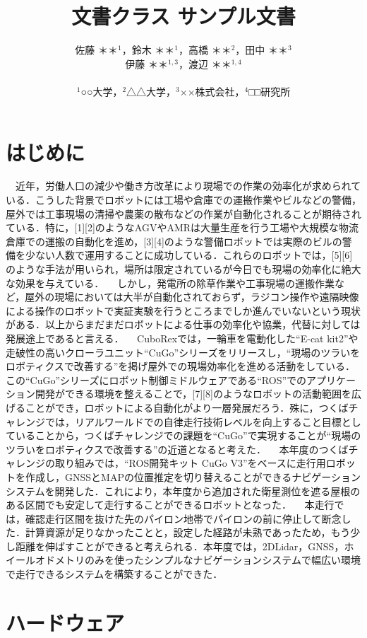 \documentclass[platex,dvipdfmx]{rbproceedings}
\title{\pkg{RBProceedings}文書クラス サンプル文書}
\author{%
佐藤 ＊＊${}^{1}$，鈴木 ＊＊${}^{1}$，高橋 ＊＊${}^{2}$，田中 ＊＊${}^{3}$\\
伊藤 ＊＊${}^{1,3}$，渡辺 ＊＊${}^{1,4}$\\ \\
${}^{1}$○○大学，${}^{2}$△△大学，${}^{3}$××株式会社，${}^{4}$□□研究所
}
\begin{document}
\maketitle


\section{はじめに}
　近年，労働人口の減少や働き方改革により現場での作業の効率化が求められている．こうした背景でロボットには工場や倉庫での運搬作業やビルなどの警備，屋外では工事現場の清掃や農薬の散布などの作業が自動化されることが期待されている．特に，[1][2]のようなAGVやAMRは大量生産を行う工場や大規模な物流倉庫での運搬の自動化を進め，[3][4]のような警備ロボットでは実際のビルの警備を少ない人数で運用することに成功している．これらのロボットでは，[5][6]のような手法が用いられ，場所は限定されているが今日でも現場の効率化に絶大な効果を与えている．
　しかし，発電所の除草作業や工事現場の運搬作業など，屋外の現場においては大半が自動化されておらず，ラジコン操作や遠隔映像による操作のロボットで実証実験を行うところまでしか進んでいないという現状がある．以上からまだまだロボットによる仕事の効率化や協業，代替に対しては発展途上であると言える．
　CuboRexでは，一輪車を電動化した“E-cat kit2”や走破性の高いクローラユニット“CuGo”シリーズをリリースし，“現場のツラいをロボティクスで改善する”を掲げ屋外での現場効率化を進める活動をしている．この“CuGo”シリーズにロボット制御ミドルウェアである“ROS”でのアプリケーション開発ができる環境を整えることで，[7][8]のようなロボットの活動範囲を広げることができ，ロボットによる自動化がより一層発展だろう．殊に，つくばチャレンジでは，リアルワールドでの自律走行技術レベルを向上すること目標としていることから，つくばチャレンジでの課題を“CuGo”で実現することが“現場のツラいをロボティクスで改善する”の近道となると考えた．
　本年度のつくばチャレンジの取り組みでは，“ROS開発キット CuGo V3”をベースに走行用ロボットを作成し，GNSSとMAPの位置推定を切り替えることができるナビゲーションシステムを開発した．これにより，本年度から追加された衛星測位を遮る屋根のある区間でも安定して走行することができるロボットとなった．
　本走行では，確認走行区間を抜けた先のパイロン地帯でパイロンの前に停止して断念した．計算資源が足りなかったことと，設定した経路が未熟であったため，もう少し距離を伸ばすことができると考えられる．本年度では，2DLidar，GNSS，ホイールオドメトリのみを使ったシンプルなナビゲーションシステムで幅広い環境で走行できるシステムを構築することができた．

\section{ハードウェア}
\end{document}
